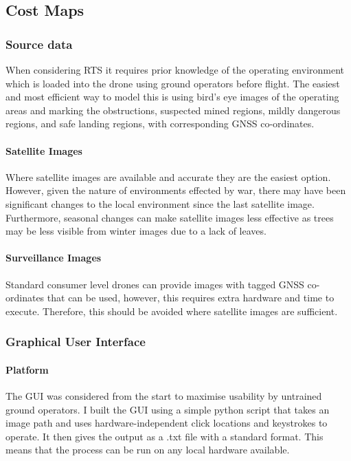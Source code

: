 \subsection{Cost Maps}
\subsubsection{Source data}
When considering \gls{RTS} it requires prior knowledge of the operating environment which is loaded into the drone using ground operators before flight. The easiest and most efficient way to model this is using bird's eye images of the operating areas and marking the obstructions, suspected mined regions, mildly dangerous regions, and safe landing regions, with corresponding \gls{GNSS} co-ordinates.
\paragraph{Satellite Images}
Where satellite images are available and accurate they are the easiest option. However, given the nature of environments effected by war, there may have been significant changes to the local environment since the last satellite image. Furthermore, seasonal changes can make satellite images less effective as trees may be less visible from winter images due to a lack of leaves.
\paragraph{Surveillance Images}
Standard consumer level drones can provide images with tagged \gls{GNSS} co-ordinates that can be used, however, this requires extra hardware and time to execute. Therefore, this should be avoided where satellite images are sufficient.

\subsubsection{Graphical User Interface}
\paragraph{Platform} 
The \gls{GUI} was considered from the start to maximise usability by untrained ground operators. I built the \gls{GUI} using a simple python script that takes an image path and uses hardware-independent click locations and keystrokes to operate. It then gives the output as a .txt file with a standard format. This means that the process can be run on any local hardware available.
